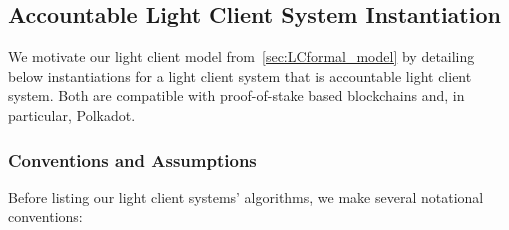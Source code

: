 \subsection{Accountable Light Client System Instantiation}
\label{sec:LCinstantiation} 

\noindent We motivate our light client model from~\ref{sec:LCformal_model} by detailing below instantiations 
for a light client system that is accountable light client system. Both are 
compatible with proof-of-stake based blockchains and, in particular, Polkadot.

\subsubsection{Conventions and Assumptions}
\label{sec:conventions}

\noindent Before listing our light client systems' algorithms, we make several notational conventions:


